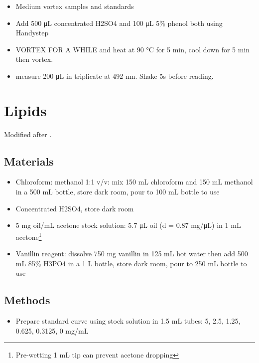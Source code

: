 \documentclass[
]{book}
\providecommand{\tightlist}{%
  \setlength{\itemsep}{0pt}\setlength{\parskip}{0pt}}
\begin{document}
\begin{itemize}
\tightlist
\item
  Medium vortex samples and standards
\item
  Add 500 μL concentrated H2SO4 and 100 μL 5\% phenol both using Handystep
\item
  VORTEX FOR A WHILE and heat at 90 °C for 5 min, cool down for 5 min then vortex.
\item
  measure 200 μL in triplicate at 492 nm. Shake 5s before reading.
\end{itemize}

\hypertarget{lipids}{%
\chapter{Lipids}\label{lipids}}

Modified after \textcite{inouye2006}.

\hypertarget{materials-4}{%
\section{Materials}\label{materials-4}}

\begin{itemize}
\tightlist
\item
  Chloroform: methanol 1:1 v/v: mix 150 mL chloroform and 150 mL methanol in a 500 mL bottle, store dark room, pour to 100 mL bottle to use
\item
  Concentrated H2SO4, store dark room
\item
  5 mg oil/mL acetone stock solution: 5.7 μL oil (d = 0.87 mg/μL) in 1 mL acetone\footnote{Pre-wetting 1 mL tip can prevent acetone dropping}
\item
  Vanillin reagent: dissolve 750 mg vanillin in 125 mL hot water then add 500 mL 85\% H3PO4 in a 1 L bottle, store dark room, pour to 250 mL bottle to use
\end{itemize}

\hypertarget{methods-4}{%
\section{Methods}\label{methods-4}}

\begin{itemize}
\tightlist
\item
  Prepare standard curve using stock solution in 1.5 mL tubes: 5, 2.5, 1.25, 0.625, 0.3125, 0 mg/mL
\end{itemize}
\end{document}
